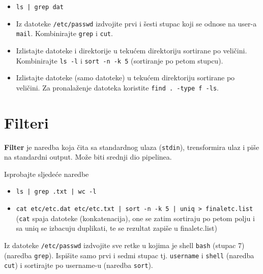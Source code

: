 \begin{itemize}
\item \lstinline!ls | grep dat!
\item Iz datoteke \texttt{/etc/passwd} izdvojite prvi i šesti stupac koji se odnose na user-a \texttt{mail}. Kombinirajte \texttt{grep} i \texttt{cut}. 
\item Izlistajte datoteke i direktorije u tekućem direktoriju sortirane po veličini. Kombinirajte \lstinline!ls -l! i \lstinline!sort -n -k 5! (sortiranje po petom stupcu).
\item Izlistajte datoteke (samo datoteke) u tekućem direktoriju sortirane po veličini. Za pronalaženje datoteka koristite \lstinline!find . -type f -ls!.
\end{itemize}
\section{Filteri}
\textbf{Filter} je naredba koja čita sa standardnog ulaza (\texttt{stdin}), trensformira ulaz i piše na standardni output. Može biti srednji dio pipelinea.

\begin{primjer} Isprobajte sljedeće naredbe
\begin{itemize}
\item \texttt{ls | grep .txt | wc -l }
\item \texttt{cat etc/etc.dat etc/etc.txt | sort -n -k 5 | uniq > finaletc.list}  (\texttt{cat} spaja datoteke (konkatenacija), 
one se zatim sortiraju po petom polju i sa uniq se izbacuju duplikati, te se rezultat zapiše u finaletc.list)
\end{itemize}
\end{primjer}

\begin{zadatak} 
Iz datoteke \texttt{/etc/passwd} izdvojite sve retke u kojima je shell \texttt{bash} (stupac 7) (naredba \texttt{grep}). Ispišite samo prvi i sedmi stupac tj. \texttt{username} i \texttt{shell} (naredba \texttt{cut}) i sortirajte po username-u (naredba \texttt{sort}). 
\end{zadatak}

\begin{comment}

\vfill
\begin{itemize}
\renewcommand{\labelitemi}{\textbf{$\rightarrow$}}
\item Popis svih pokrenutih naredbi eksportirajte u datoteku imena \texttt{prezime\_ime\_vj6.txt}. Uploadajte datoteku na \href{https://moodle.oss.unist.hr/course/view.php?id=133}{http://moodle.oss.unist.hr}.
\end{itemize}

\end{comment}



